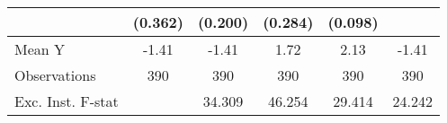 {\begin{tabular}{l*{5}{c}}
            &     (0.362)         &     (0.200)         &     (0.284)         &     (0.098)         &                     \\
\midrule
Mean Y      &       -1.41         &       -1.41         &        1.72         &        2.13         &       -1.41         \\
Observations&         390         &         390         &         390         &         390         &         390         \\
Exc. Inst. F-stat&                     &      34.309         &      46.254         &      29.414         &      24.242         \\
\bottomrule
\end{tabular}
}
